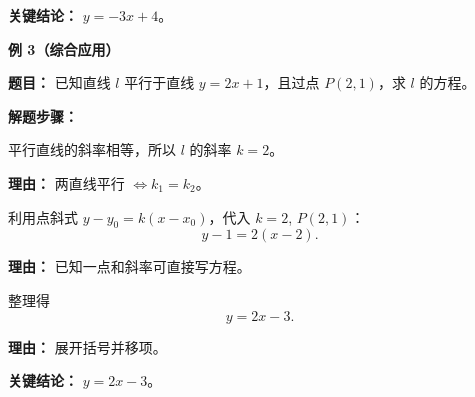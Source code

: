 \begin{examplebox}
	\textbf{\textcolor{CExample}{关键结论：}}
	\textbf{$y=-3x+4$}。

	\medskip
	\textbf{\textcolor{CExample}{例 3（综合应用）}}

	\textbf{\textcolor{CExample}{题目：}}
	已知直线 $l$ 平行于直线 $y = 2x + 1$，且过点 $P(2,1)$，求 $l$ 的方程。

	\textbf{\textcolor{CExample}{解题步骤：}}
	\begin{description}[style=nextline, leftmargin=2.8em, labelsep=0.5em, itemsep=0.45em]
		\item[\textbf{第一步（确定斜率）：}] 平行直线的斜率相等，所以 $l$ 的斜率 $k = 2$。
			\par\textbf{理由：} 两直线平行 $\Leftrightarrow k_1 = k_2$。

		\item[\textbf{第二步（点斜式求方程）：}] 利用点斜式 $y - y_0 = k(x - x_0)$，代入 $k=2$, $P(2,1)$：
			\[
				y - 1 = 2(x - 2).
			\]
			\par\textbf{理由：} 已知一点和斜率可直接写方程。

		\item[\textbf{第三步（化为斜截式）：}] 整理得
			\[
				y = 2x - 3.
			\]
			\par\textbf{理由：} 展开括号并移项。
	\end{description}

	\textbf{\textcolor{CExample}{关键结论：}}
	\textbf{$y = 2x - 3$}。
\end{examplebox}
